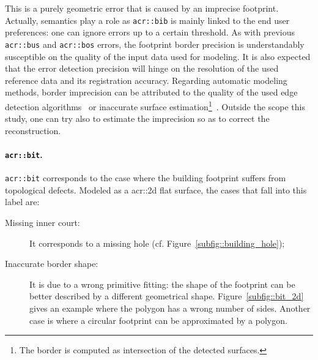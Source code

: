                 This is a purely geometric error that is caused by an imprecise footprint.
                Actually, semantics play a role as \texttt{\gls{acr::bib}} is mainly linked to the end user preferences: one can ignore errors up to a certain threshold. 
                As with previous \texttt{\gls{acr::bus}} and \texttt{\gls{acr::bos}} errors, the footprint border precision is understandably susceptible on the quality of the input data used for modeling.
                It is also expected that the error detection precision will hinge on the resolution of the used reference data and its registration accuracy.
                Regarding automatic modeling methods, border imprecision can be attributed to the quality of the used edge detection algorithms~\parencite{baillard1999automatic,werner2002new,nan2015template} or inaccurate surface estimation\footnote{
                    The border is computed as intersection of the detected surfaces.
                }~\parencite{durupt2006automatic,xiong2014graph}.
                Outside the scope this study, one can try also to estimate the imprecision so as to correct the reconstruction.

            \paragraph{\texttt{\acrlong*{acr::bit}}.}
                \texttt{\gls{acr::bit}} corresponds to the case where the building footprint suffers from topological defects.
                Modeled as a \gls{acr::2d} flat surface, the cases that fall into this label are:
                \begin{description}
                    \item[Missing inner court:] It corresponds to a missing hole (cf. Figure~\ref{subfig::building_hole});
                    \item[Inaccurate border shape:] It is due to a wrong primitive fitting: the shape of the footprint can be better described by a different geometrical shape.
                            Figure~\ref{subfig::bit_2d} gives an example where the polygon has a wrong number of sides.
                            Another case is where a circular footprint can be approximated by a polygon.
                \end{description}

